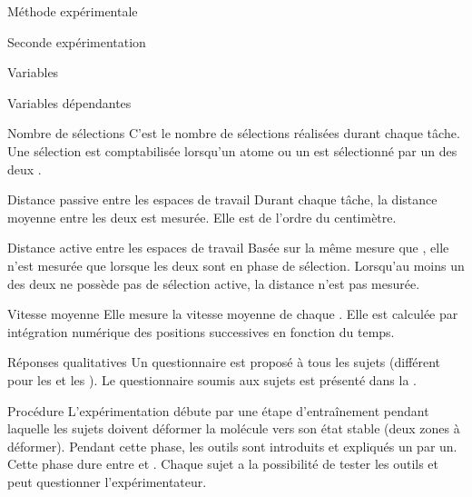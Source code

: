 \documentclass[myfrancais,ngerman,english,frenchb]{mythesis}
\begin{document}
\begin{mychapter}{Méthode expérimentale}
\begin{mysection}{Seconde expérimentation}
\begin{mysubsection}{Variables}
\begin{mysubsubsection}{Variables dépendantes}
\begin{myparagraph}{ Nombre de sélections}
						C'est le nombre de sélections réalisées durant chaque tâche.
						Une sélection est comptabilisée lorsqu'un atome ou un  est sélectionné par un des deux .
					\end{myparagraph}
					\begin{myparagraph}{ Distance passive entre les espaces de travail}
						Durant chaque tâche, la distance moyenne entre les deux  est mesurée.
						Elle est de l'ordre du centimètre.
					\end{myparagraph}
					\begin{myparagraph}{ Distance active entre les espaces de travail}
						Basée sur la même mesure que , elle n'est mesurée que lorsque les deux  sont en phase de sélection.
						Lorsqu'au moins un des deux  ne possède pas de sélection active, la distance n'est pas mesurée.
					\end{myparagraph}
					\begin{myparagraph}{ Vitesse moyenne}
						Elle mesure la vitesse moyenne de chaque .
						Elle est calculée par intégration numérique des positions successives en fonction du temps.
					\end{myparagraph}
					\begin{myparagraph}{ Réponses qualitatives}
						Un questionnaire est proposé à tous les sujets (différent pour les  et les ).
						Le questionnaire soumis aux sujets est présenté dans la .
					\end{myparagraph}
				\end{mysubsubsection}
			\end{mysubsection}
			\begin{mysubsection}{Procédure}
				L'expérimentation débute par une étape d'entraînement pendant laquelle les sujets doivent déformer la molécule \myPrion vers son état stable (deux zones à déformer).
				Pendant cette phase, les outils sont introduits et expliqués un par un.
				Cette phase dure entre  et .
				Chaque sujet a la possibilité de tester les outils et peut questionner l'expérimentateur.


\end{mysubsection}
\end{mysection}
\end{mychapter}
\end{document}
